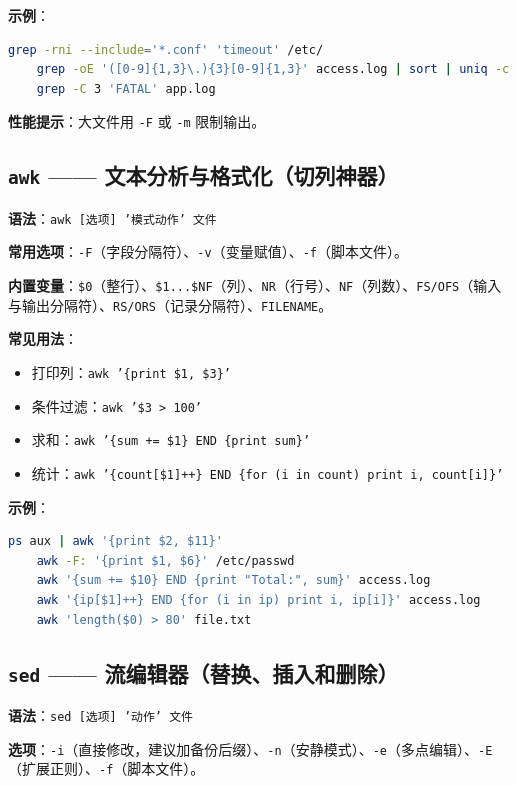 \textbf{示例}：
\begin{lstlisting}[language=bash]
	grep -rni --include='*.conf' 'timeout' /etc/
	grep -oE '([0-9]{1,3}\.){3}[0-9]{1,3}' access.log | sort | uniq -c
	grep -C 3 'FATAL' app.log
\end{lstlisting}

\textbf{性能提示}：大文件用 \texttt{-F} 或 \texttt{-m} 限制输出。

\subsection{\texttt{awk} —— 文本分析与格式化（切列神器）} \textbf{语法}：\texttt{awk [选项] '模式{动作}' 文件}

\textbf{常用选项}：\texttt{-F}（字段分隔符）、\texttt{-v}（变量赋值）、\texttt{-f}（脚本文件）。

\textbf{内置变量}：\texttt{\$0}（整行）、\texttt{\$1...\$NF}（列）、\texttt{NR}（行号）、\texttt{NF}（列数）、\texttt{FS/OFS}（输入与输出分隔符）、\texttt{RS/ORS}（记录分隔符）、\texttt{FILENAME}。

\textbf{常见用法}：
\begin{itemize}
\item 打印列：\texttt{awk '\{print \$1, \$3\}'}
\item 条件过滤：\texttt{awk '\$3 > 100'}
\item 求和：\texttt{awk '\{sum += \$1\} END \{print sum\}'}
\item 统计：\texttt{awk '\{count[\$1]++\} END \{for (i in count) print i, count[i]\}'}
\end{itemize}

\textbf{示例}：
\begin{lstlisting}[language=bash]
	ps aux | awk '{print $2, $11}'
	awk -F: '{print $1, $6}' /etc/passwd
	awk '{sum += $10} END {print "Total:", sum}' access.log
	awk '{ip[$1]++} END {for (i in ip) print i, ip[i]}' access.log
	awk 'length($0) > 80' file.txt
\end{lstlisting}

\subsection{\texttt{sed} —— 流编辑器（替换、插入和删除）} \textbf{语法}：\texttt{sed [选项] '动作' 文件}

\textbf{选项}：\texttt{-i}（直接修改，建议加备份后缀）、\texttt{-n}（安静模式）、\texttt{-e}（多点编辑）、\texttt{-E}（扩展正则）、\texttt{-f}（脚本文件）。

